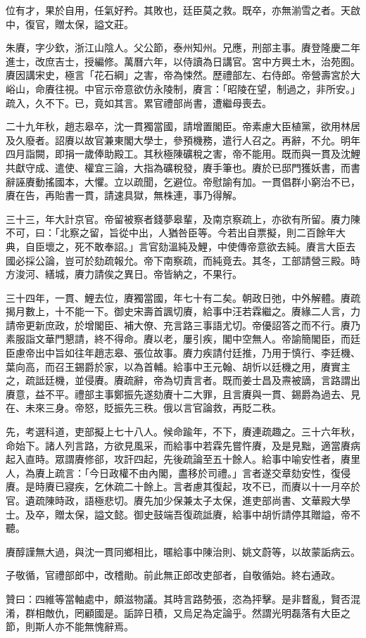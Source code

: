 \begin{pinyinscope}
位有才，果於自用，任氣好矜。其敗也，廷臣莫之救。既卒，亦無湔雪之者。天啟中，復官，贈太保，謚文莊。

朱賡，字少欽，浙江山陰人。父公節，泰州知州。兄應，刑部主事。賡登隆慶二年進士，改庶吉士，授編修。萬曆六年，以侍讀為日講官。宮中方興土木，治苑囿。賡因講宋史，極言「花石綱」之害，帝為悚然。歷禮部左、右侍郎。帝營壽宮於大峪山，命賡往視。中官示帝意欲仿永陵制，賡言：「昭陵在望，制過之，非所安。」疏入，久不下。已，竟如其言。累官禮部尚書，遭繼母喪去。

二十九年秋，趙志皋卒，沈一貫獨當國，請增置閣臣。帝素慮大臣植黨，欲用林居及久廢者。詔賡以故官兼東閣大學士，參預機務，遣行人召之。再辭，不允。明年四月詣闕，即捐一歲俸助殿工。其秋極陳礦稅之害，帝不能用。既而與一貫及沈鯉共獻守成、遣使、權宜三論，大指為礦稅發，賡手筆也。賡於已邸門獲妖書，而書辭誣賡動搖國本，大懼。立以疏聞，乞避位。帝慰諭有加。一貫倡群小窮治不已，賡在告，再貽書一貫，請速具獄，無株連，事乃得解。

三十三，年大計京官。帝留被察者錢夢皋輩，及南京察疏上，亦欲有所留。賡力陳不可，曰：「北察之留，旨從中出，人猶咎臣等。今若出自票擬，則二百餘年大典，自臣壞之，死不敢奉詔。」言官劾溫純及鯉，中使傳帝意欲去純。賡言大臣去國必採公論，豈可於劾疏報允。帝下南察疏，而純竟去。其冬，工部請營三殿。時方浚河、繕城，賡力請俟之異日。帝皆納之，不果行。

三十四年，一貫、鯉去位，賡獨當國，年七十有二矣。朝政日弛，中外解體。賡疏揭月數上，十不能一下。御史宋壽首諷切賡，給事中汪若霖繼之。賡緣二人言，力請帝更新庶政，於增閣臣、補大僚、充言路三事語尤切。帝優詔答之而不行。賡乃素服詣文華門懇請，終不得命。賡以老，屢引疾，閣中空無人。帝諭簡閣臣，而廷臣慮帝出中旨如往年趙志皋、張位故事。賡力疾請付廷推，乃用于慎行、李廷機、葉向高，而召王錫爵於家，以為首輔。給事中王元翰、胡忻以廷機之用，賡實主之，疏詆廷機，並侵賡。賡疏辭，帝為切責言者。既而姜士昌及燾被謫，言路謂出賡意，益不平。禮部主事鄭振先遂劾賡十二大罪，且言賡與一貫、錫爵為過去、見在、未來三身。帝怒，貶振先三秩。俄以言官論救，再貶二秩。

先，考選科道，吏部擬上七十八人。候命踰年，不下，賡連疏趣之。三十六年秋，命始下。諸人列言路，方欲見風采，而給事中若霖先嘗忤賡，及是見黜，適當賡病起入直時。眾謂賡修郤，攻訐四起，先後疏論至五十餘人。給事中喻安性者，賡里人，為賡上疏言：「今日政權不由內閣，盡移於司禮。」言者遂交章劾安性，復侵賡。是時賡已寢疾，乞休疏二十餘上。言者慮其復起，攻不已，而賡以十一月卒於官。遺疏陳時政，語極悲切。賡先加少保兼太子太保，進吏部尚書、文華殿大學士。及卒，贈太保，謚文懿。御史鼓端吾復疏詆賡，給事中胡忻請停其贈謚，帝不聽。

賡醇謹無大過，與沈一貫同鄉相比，暱給事中陳治則、姚文蔚等，以故蒙詬病云。

子敬循，官禮部郎中，改稽勛。前此無正郎改吏部者，自敬循始。終右通政。

贊曰：四維等當軸處中，頗滋物議。其時言路勢張，恣為抨擊。是非瞀亂，賢否混淆，群相敵仇，罔顧國是。詬誶日積，又烏足為定論乎。然謂光明磊落有大臣之節，則斯人亦不能無愧辭焉。


\end{pinyinscope}